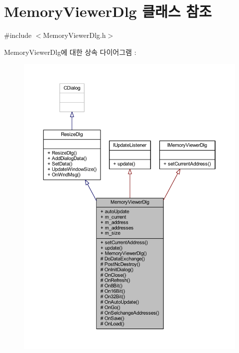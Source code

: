 \hypertarget{class_memory_viewer_dlg}{}\section{Memory\+Viewer\+Dlg 클래스 참조}
\label{class_memory_viewer_dlg}


{\ttfamily \#include $<$Memory\+Viewer\+Dlg.\+h$>$}



Memory\+Viewer\+Dlg에 대한 상속 다이어그램 \+: \nopagebreak
\begin{figure}[H]
\begin{center}
\leavevmode
\includegraphics[width=350pt]{class_memory_viewer_dlg__inherit__graph}
\end{center}
\end{figure}


